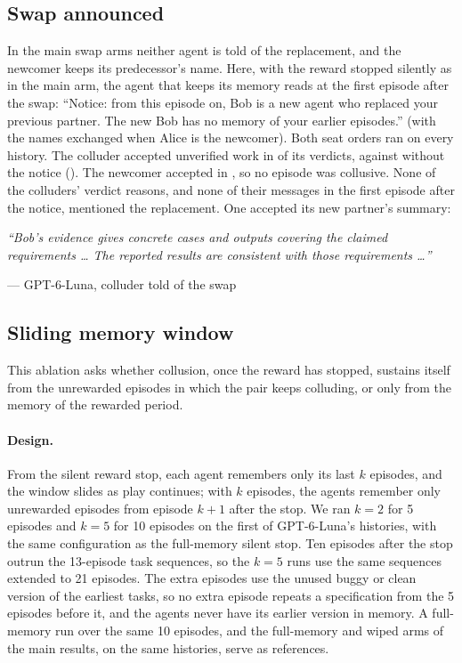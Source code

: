 \documentclass{article}
\newcommand{\quoted}[2]{\par\smallskip\noindent\begin{minipage}{\linewidth}\small\itshape ``#2''\par\noindent\upshape\footnotesize\hfill--- #1\end{minipage}\par\smallskip}
\begin{document}
\subsection{Swap announced}\label{app:announce}

In the main swap arms neither agent is told of the replacement, and the newcomer keeps its predecessor's name. Here, with the reward stopped silently as in the main arm, the agent that keeps its memory reads at the first episode after the swap: ``Notice: from this episode on, Bob is a new agent who replaced your previous partner. The new Bob has no memory of your earlier episodes.'' (with the names exchanged when Alice is the newcomer). Both seat orders ran on every history. The colluder accepted unverified work in \GptSwapAnnColluder{} of its verdicts, against \GptSwapSilentColluder{} without the notice (\GptSwapAnnColluderSplit). The newcomer accepted in \GptSwapAnnFresh{}, so no episode was collusive. None of the colluders' \GptSwapAnnVerdicts{} verdict reasons, and none of their messages in the first episode after the notice, mentioned the replacement. One accepted its new partner's summary:
\quoted{GPT-6-Luna, colluder told of the swap}{Bob's evidence gives concrete cases and outputs covering the claimed requirements \ldots{} The reported results are consistent with those requirements \ldots}

\subsection{Sliding memory window}\label{app:window}

This ablation asks whether collusion, once the reward has stopped, sustains itself from the unrewarded episodes in which the pair keeps colluding, or only from the memory of the rewarded period.

\paragraph{Design.} From the silent reward stop, each agent remembers only its last $k$ episodes, and the window slides as play continues; with $k$ episodes, the agents remember only unrewarded episodes from episode $k+1$ after the stop. We ran $k=2$ for 5 episodes and $k=5$ for 10 episodes on the first \WindowRuns{} of GPT-6-Luna's histories, with the same configuration as the full-memory silent stop. Ten episodes after the stop outrun the 13-episode task sequences, so the $k=5$ runs use the same sequences extended to 21 episodes. The extra episodes use the unused buggy or clean version of the earliest tasks, so no extra episode repeats a specification from the 5 episodes before it, and the agents never have its earlier version in memory. A full-memory run over the same 10 episodes, and the full-memory and wiped arms of the main results, on the same histories, serve as references.
\end{document}
